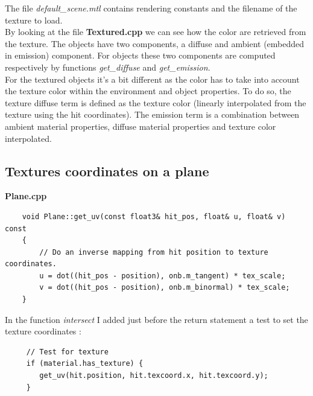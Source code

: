 \documentclass[a4,12pt]{article}
\begin{document}
	The file \textit{default\_scene.mtl} contains rendering constants and the filename of the texture to load.\\
		
		
	By looking at the file \textbf{Textured.cpp} we can see how the color are retrieved from the texture. The objects have two components, a diffuse and ambient (embedded in emission) component. For objects these two components are computed respectively by functions \textit{get\_diffuse} and \textit{get\_emission}.\\
	
	For the textured objects it's a bit different as the color has to take into account the texture color within the environment and object properties. To do so, the texture diffuse term is defined as the texture color (linearly interpolated from the texture using the hit coordinates). The emission term is a combination between ambient material properties, diffuse material properties and texture color interpolated.
	
	
%	
	
	
	
	\subsection{Textures coordinates on a plane}
	\textbf{Plane.cpp}
	\begin{lstlisting}
	void Plane::get_uv(const float3& hit_pos, float& u, float& v) const
	{
		// Do an inverse mapping from hit position to texture coordinates.
		u = dot((hit_pos - position), onb.m_tangent) * tex_scale;
		v = dot((hit_pos - position), onb.m_binormal) * tex_scale;
	}
	\end{lstlisting}
	 In the function \textit{intersect} I added just before the return statement a test to set the texture coordinates :
	 \begin{lstlisting}
	 // Test for texture
	 if (material.has_texture) {
	 	get_uv(hit.position, hit.texcoord.x, hit.texcoord.y);
	 }
	 \end{lstlisting}
	 
\end{document}
